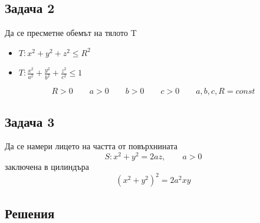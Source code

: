 \documentclass[a4paper,fleqn,12pt]{article}
\theoremstyle{definition}
\begin{document}
\subsection*{Задача 2}
Да се пресметне обемът на тялото T
\begin{itemize}
\item $T: x^2 + y^2 + z^2 \leq R^2$
\item $T: \frac{x^2}{a^2} + \frac{y^2}{b^2} +  \frac{z^2}{c^2} \leq 1$
\end{itemize}
$$R>0 \qquad a>0 \qquad b>0 \qquad c > 0 \qquad  a,b,c,R = const$$

\subsection*{Задача 3}
Да се намери лицето на частта от повърхнината 
$$S: x^2 + y^2 = 2az, \qquad a>0$$
заключена в цилиндъра 
$$(x^2 + y^2)^2 = 2a^2xy$$

\newpage
\subsection{Решения}
\end{document}
